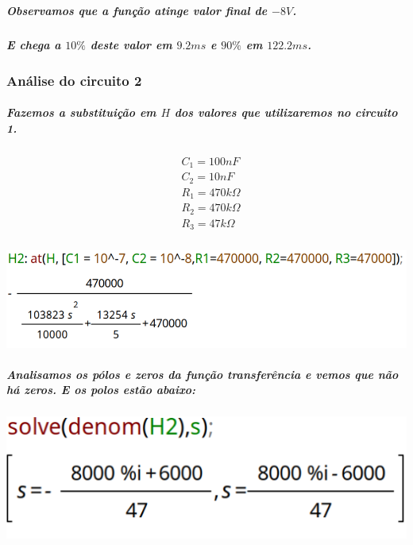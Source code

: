 \documentclass[12pt,twoside, a4paper, twocolumn]{article}
\begin{document}
\subparagraph*{Observamos que a função atinge valor final de $-8V$.}


\subparagraph*{E chega a $10\%$ deste valor em $9.2ms$ e $90\%$ em $122.2ms$.}


\subsubsection{Análise do circuito 2}


\subparagraph*{Fazemos a substituição em $H$ dos valores que utilizaremos no circuito 1.}




\begin{equation*}
    \begin{aligned}
         & C_1  = 100nF          \\
         & C_2  = 10nF           \\
         & R_1  = 470k \varOmega \\
         & R_2  = 470k \varOmega \\
         & R_3  = 47k \varOmega
    \end{aligned}
\end{equation*}




\subparagraph*{}




\begin{adjustbox}{scale=0.34}
    \includegraphics{H2.png}
\end{adjustbox}




\subparagraph*{Analisamos os pólos e zeros da função transferência e vemos que não há zeros. E os polos estão abaixo:}


\subparagraph*{}


\begin{adjustbox}{scale=0.5}
    \includegraphics{H2denom.png}
\end{adjustbox}
\end{document}
